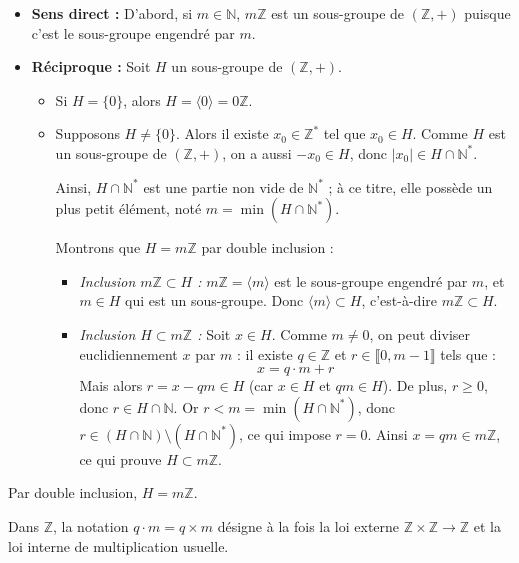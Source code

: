 \documentclass[a4paper,11pt]{article}
\newcommand{\N}{\mathbb{N}}
\newcommand{\Z}{\mathbb{Z}}
\newcommand{\intEnt}[2]{\llbracket #1, #2 \rrbracket}
\begin{document}
\begin{demonstration}
\begin{itemize}
    \item \textbf{Sens direct :} D'abord, si $m \in \N$, $m\Z$ est un sous-groupe de $(\Z, +)$ puisque c'est le sous-groupe engendré par $m$.
    
    \item \textbf{Réciproque :} Soit $H$ un sous-groupe de $(\Z, +)$.
    \begin{itemize}
        \item Si $H = \{0\}$, alors $H = \langle 0 \rangle = 0\Z$.
        \item Supposons $H \neq \{0\}$. Alors il existe $x_0 \in \Z^*$ tel que $x_0 \in H$. Comme $H$ est un sous-groupe de $(\Z, +)$, on a aussi $-x_0 \in H$, donc $|x_0| \in H \cap \N^*$.
        
        Ainsi, $H \cap \N^*$ est une partie non vide de $\N^*$ ; à ce titre, elle possède un plus petit élément, noté $m = \min(H \cap \N^*)$.
        
        Montrons que $H = m\Z$ par double inclusion :
        \begin{itemize}
            \item \textit{Inclusion $m\Z \subset H$ :} $m\Z = \langle m \rangle$ est le sous-groupe engendré par $m$, et $m \in H$ qui est un sous-groupe. Donc $\langle m \rangle \subset H$, c'est-à-dire $m\Z \subset H$.
            \item \textit{Inclusion $H \subset m\Z$ :} Soit $x \in H$. Comme $m \neq 0$, on peut diviser euclidiennement $x$ par $m$ : il existe $q \in \Z$ et $r \in \intEnt{0}{m-1}$ tels que :
            \[
            x = q \cdot m + r
            \]
            Mais alors $r = x - qm \in H$ (car $x \in H$ et $qm \in H$). De plus, $r \ge 0$, donc $r \in H \cap \N$.
            Or $r < m = \min(H \cap \N^*)$, donc $r \in (H \cap \N) \setminus (H \cap \N^*)$, ce qui impose $r = 0$.
            Ainsi $x = qm \in m\Z$, ce qui prouve $H \subset m\Z$.
        \end{itemize}
    \end{itemize}
\end{itemize}
Par double inclusion, $H = m\Z$.
\end{demonstration}

\begin{remarque}
Dans $\Z$, la notation $q \cdot m = q \times m$ désigne à la fois la loi externe $\Z \times \Z \to \Z$ et la loi interne de multiplication usuelle.
\end{remarque}
\end{document}
